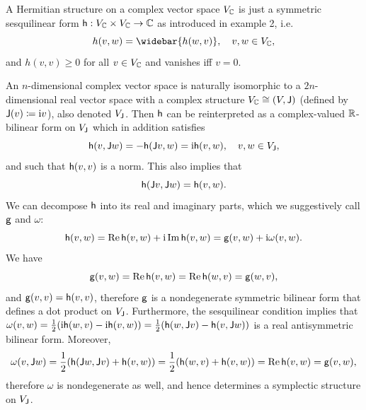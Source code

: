 \begin{example}\label{ex hermitian structures}
    A Hermitian structure on a complex vector space $V_{\mathbb{C}}$ is just a symmetric sesquilinear form $\mathsf{h}:V_{\mathbb{C}}\times V_{\mathbb{C}}\to \mathbb{C}$ as introduced in example 2, i.e.
    \[h(v,w)=\widebar{h(w,v)},\quad v,w\in V_\bbC,\]
    and $h(v,v)\geq 0$ for all $v\in V_{\mathbb{C}}$ and vanishes iff $v=0$.
    
    An $n$-dimensional complex vector space is naturally isomorphic to a $2n$-dimensional real vector space with a complex structure $V_{\mathbb{C}}\cong (V,\mathsf{J})$ (defined by $\mathsf{J}(v)\coloneqq \mathrm{i} v$), also denoted $V_{\mathsf{J}}$. Then $\mathsf{h}$ can be reinterpreted as a complex-valued $\mathbb{R}$-bilinear form on $V_{\mathsf{J}}$ which in addition satisfies
    \[\mathsf{h}(v,\mathsf{J} w)=-\mathsf{h}(\mathsf{J} v,w)=\mathrm{i}\mathsf{h}(v,w),\quad v,w\in V_{\mathsf{J}},\]
    and such that $\mathsf{h}(v,v)$ is a norm. This also implies that
    \[\mathsf{h}(\mathsf{J} v,\mathsf{J} w)=\mathsf{h}(v,w).\]
    We can decompose $\mathsf{h}$ into its real and imaginary parts, which we suggestively call $\mathsf{g}$ and $\omega$:
    \[\mathsf{h}(v,w)=\operatorname{Re} \mathsf{h}(v,w)+\mathrm{i}\operatorname{Im}\mathsf{h}(v,w)=\mathsf{g}(v,w)+\mathrm{i} \omega(v,w).\]
    We have
    \[\mathsf{g}(v,w)=\operatorname{Re} \mathsf{h}(v,w)=\operatorname{Re} \mathsf{h}(w,v)=\mathsf{g}(w,v),\]
    and $\mathsf{g}(v,v)=\mathsf{h}(v,v)$, therefore $\mathsf{g}$ is a nondegenerate symmetric bilinear form that defines a dot product on $V_{\mathsf{J}}$.
    Furthermore, the sesquilinear condition implies that 
    $\omega(v,w)=\frac12 (\mathrm{i}\mathsf{h}(w,v)-\mathrm{i}\mathsf{h}(v,w))=\frac12 (\mathsf{h}(w,\mathsf{J} v)-\mathsf{h}(v,\mathsf{J} w))$
    is a real antisymmetric bilinear form. 
    Moreover,
    \[\omega(v,\mathsf{J} w)=\frac12 (\mathsf{h}(\mathsf{J} w,\mathsf{J} v)+\mathsf{h}(v,w))=\frac12 (\mathsf{h}(w,v)+\mathsf{h}(v,w))=\operatorname{Re} \mathsf{h}(v,w)=\mathsf{g}(v,w),\]
    therefore $\omega$ is nondegenerate as well, and hence determines a symplectic structure on $V_{\mathsf{J}}$. 


\end{example}
